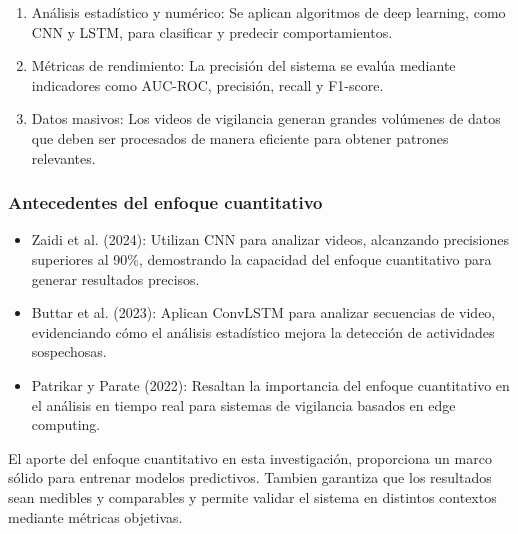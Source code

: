 \begin{enumerate}
    \item Análisis estadístico y numérico: Se aplican algoritmos de deep learning, como CNN y LSTM, para clasificar y predecir comportamientos.
    \item Métricas de rendimiento: La precisión del sistema se evalúa mediante indicadores como AUC-ROC, precisión, recall y F1-score.
    \item Datos masivos: Los videos de vigilancia generan grandes volúmenes de datos que deben ser procesados de manera eficiente para obtener patrones relevantes.
\end{enumerate}

\subsubsection{Antecedentes del enfoque cuantitativo}
\begin{itemize}
    \item Zaidi et al. (2024): Utilizan CNN para analizar videos, alcanzando precisiones superiores al 90\%, demostrando la capacidad del enfoque cuantitativo para generar resultados precisos.
    \item Buttar et al. (2023): Aplican ConvLSTM para analizar secuencias de video, evidenciando cómo el análisis estadístico mejora la detección de actividades sospechosas.
    \item Patrikar y Parate (2022): Resaltan la importancia del enfoque cuantitativo en el análisis en tiempo real para sistemas de vigilancia basados en edge computing.
\end{itemize}

El aporte del enfoque cuantitativo en esta investigación, proporciona un marco sólido para entrenar modelos predictivos. Tambien garantiza que los resultados sean medibles y comparables y permite validar el sistema en distintos contextos mediante métricas objetivas.

